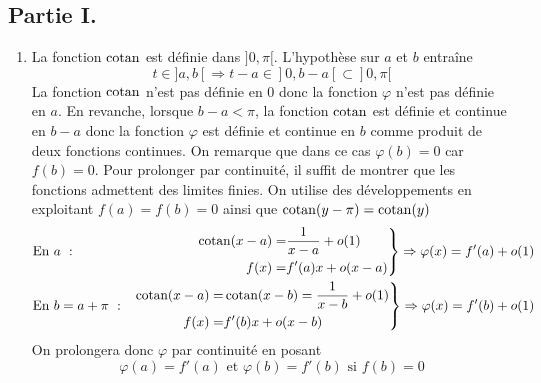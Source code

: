 \subsection*{Partie I.}
\begin{enumerate}
\item La fonction $\operatorname{cotan}$ est définie dans $]0,\pi[$. L'hypothèse sur $a$ et $b$ entraîne
\begin{displaymath}
 t\in ]a,b[ \Rightarrow t-a \in ]0,b-a[ \subset ]0,\pi[
\end{displaymath}
La fonction $\operatorname{cotan}$ n'est pas définie en $0$ donc la fonction $\varphi$ n'est pas définie en $a$.\newline
En revanche, lorsque $b-a<\pi$, la fonction $\operatorname{cotan}$ est définie et continue en $b-a$ donc la fonction $\varphi$ est définie et continue en $b$ comme produit de deux fonctions continues. On remarque que dans ce cas $\varphi(b)=0$ car $f(b)=0$. \newline
Pour prolonger par continuité, il suffit de montrer que les fonctions admettent des limites finies. On utilise des développements en exploitant $f(a)=f(b)=0$ ainsi que $\operatorname{cotan}(y-\pi)=\operatorname{cotan}(y)$
\begin{align*}
 &\text{En $a$ } :
&\left. 
\begin{aligned}
 \operatorname{cotan} (x-a) =& \frac{1}{x-a}+o(1) \\
 f(x) =& f'(a)x+o(x-a)
\end{aligned}
\right\rbrace \Rightarrow
\varphi(x)=f'(a) +o(1)
\\
 &\text{En $b=a+\pi$ } :
&\left. 
\begin{aligned}
 \operatorname{cotan} (x-a) =& \operatorname{cotan} (x-b)=\frac{1}{x-b}+o(1) \\
 f(x) =& f'(b)x+o(x-b)
\end{aligned}
\right\rbrace \Rightarrow
\varphi(x)=f'(b) +o(1)
\end{align*}
On prolongera donc $\varphi$ par continuité en posant
\begin{displaymath}
 \varphi(a)=f'(a) \text{ et } \varphi(b)=f'(b) \text{ si } f(b)=0
\end{displaymath}


\end{enumerate}
